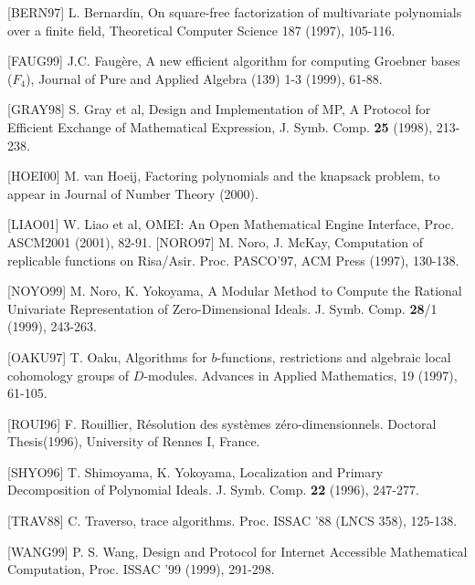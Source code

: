 \begin{slide}{}

[BERN97] L. Bernardin, On square-free factorization of 
multivariate polynomials over a finite field, Theoretical
Computer Science 187 (1997), 105-116.

[FAUG99] J.C. Faug\`ere,
A new efficient algorithm for computing Groebner bases  ($F_4$),
Journal of Pure and Applied Algebra (139) 1-3 (1999), 61-88.

[GRAY98] S. Gray et al,
Design and Implementation of MP, A Protocol for Efficient Exchange of
Mathematical Expression,
J. Symb. Comp. {\bf 25} (1998), 213-238.

[HOEI00] M. van Hoeij, Factoring polynomials and the knapsack problem,
to appear in Journal of Number Theory (2000).

[LIAO01] W. Liao et al,
OMEI: An Open Mathematical Engine Interface,
Proc. ASCM2001 (2001), 82-91.
[NORO97] M. Noro, J. McKay,
Computation of replicable functions on Risa/Asir.
Proc. PASCO'97, ACM Press (1997), 130-138.
\end{slide}

\begin{slide}{}

[NOYO99] M. Noro, K. Yokoyama, 
A Modular Method to Compute the Rational Univariate
Representation of Zero-Dimensional Ideals.
J. Symb. Comp. {\bf 28}/1 (1999), 243-263.

[OAKU97] T. Oaku, Algorithms for $b$-functions, restrictions and algebraic
local cohomology groups of $D$-modules.
Advances in Applied Mathematics, 19 (1997), 61-105.

[ROUI96] F. Rouillier,
R\'esolution des syst\`emes z\'ero-dimensionnels. 
Doctoral Thesis(1996), University of Rennes I, France.

[SHYO96] T. Shimoyama, K. Yokoyama, Localization and Primary Decomposition of Polynomial Ideals.  J. Symb. Comp. {\bf 22} (1996), 247-277.

[TRAV88] C. Traverso, \gr trace algorithms. Proc. ISSAC '88 (LNCS 358), 125-138.

[WANG99] P. S. Wang,
Design and Protocol for Internet Accessible Mathematical Computation,
Proc. ISSAC '99 (1999), 291-298.
\end{slide}

\begin{slide}{}
\begin{center}
\end{center}
\end{slide}

